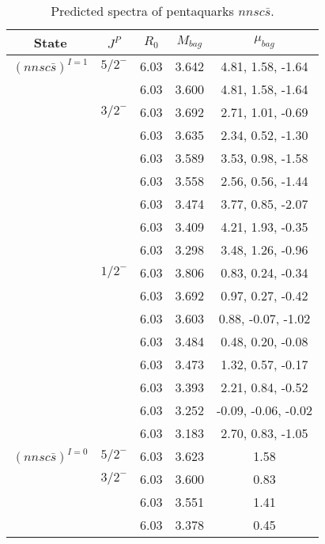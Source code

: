 \documentclass[prd,twocolumn,floatfix,nofootinbib]{revtex4}
\begin{document}
\renewcommand{\tabcolsep}{0.5cm}
\renewcommand{\arraystretch}{1.2}
\begin{table*}[!htbp]
    \caption{Predicted spectra of pentaquarks $nnsc\bar{s}$.}
    \begin{tabular}{ccccc}
        \hline\hline
        {\rm State} &$J^{P}$ &$R_{0}$ &$M_{bag}$ &$\mu_{bag}$ \\ \hline
        ${(nnsc\bar{s})}^{I=1}$
            &${5/2}^{-}$    &6.03   &3.642  &4.81, 1.58, -1.64 \\
            &               &6.03   &3.600  &4.81, 1.58, -1.64 \\
            &${3/2}^{-}$    &6.03   &3.692  &2.71, 1.01, -0.69 \\
            &               &6.03   &3.635  &2.34, 0.52, -1.30 \\
            &               &6.03   &3.589  &3.53, 0.98, -1.58 \\
            &               &6.03   &3.558  &2.56, 0.56, -1.44 \\
            &               &6.03   &3.474  &3.77, 0.85, -2.07 \\
            &               &6.03   &3.409  &4.21, 1.93, -0.35 \\
            &               &6.03   &3.298  &3.48, 1.26, -0.96 \\
            &${1/2}^{-}$    &6.03   &3.806  &0.83, 0.24, -0.34 \\
            &               &6.03   &3.692  &0.97, 0.27, -0.42 \\
            &               &6.03   &3.603  &0.88, -0.07, -1.02 \\
            &               &6.03   &3.484  &0.48, 0.20, -0.08 \\
            &               &6.03   &3.473  &1.32, 0.57, -0.17 \\
            &               &6.03   &3.393  &2.21, 0.84, -0.52 \\
            &               &6.03   &3.252  &-0.09, -0.06, -0.02 \\
            &               &6.03   &3.183  &2.70, 0.83, -1.05 \\
        ${(nnsc\bar{s})}^{I=0}$
            &${5/2}^{-}$    &6.03   &3.623  &1.58 \\
            &${3/2}^{-}$    &6.03   &3.600  &0.83 \\
            &               &6.03   &3.551  &1.41 \\
            &               &6.03   &3.378  &0.45 \\

\end{tabular}
\end{table*}
\end{document}
